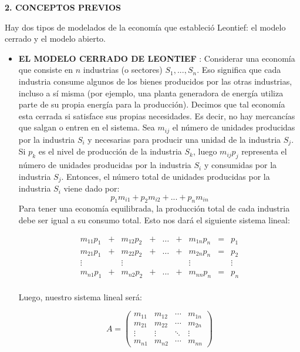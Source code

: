 \documentclass[10pt,a4paper]{article}
\begin{document}
\begin{multicols}{2}
\begin{center}
{\large \bf 2. CONCEPTOS PREVIOS}
\end{center}
Hay dos tipos de modelados de la economía que estableció Leontief: el modelo cerrado y el modelo abierto.\\
\begin{itemize}
	\item \textbf{EL MODELO CERRADO DE LEONTIEF} : Considerar una economía que consiste en $n$ industrias (o sectores)   $S_{1}, ... , S_{n}$. Eso significa que cada industria consume algunos de los bienes producidos por las otras industrias, incluso a sí misma (por ejemplo, una planta generadora de energía utiliza parte de su propia energía para la producción). Decimos que tal economía esta cerrada si satisface sus propias necesidades. Es decir, no hay mercancías que salgan o entren en el sistema. Sea $m_{ij}$ el número de unidades producidas por la industria $S_{i}$ y necesarias para producir una unidad de la industria $S_{j}$. Si $p_{k}$ es el nivel de producción de la industria $S_{k}$, luego $m_{ij}p_{j}$ representa el número de unidades producidas por la industria $S_{i}$ y consumidas por la industria $S_{j}$. Entonces, el número total de unidades producidas por la industria $S_{i}$ viene dado por:
\[  p_{1}m_{i1} + p_{2}m_{i2} + ... + p_{n}m_{in} \]
Para tener una economía equilibrada, la producción total de cada industria debe ser igual a su consumo total. Esto nos dará el siguiente sistema lineal:

\begin{equation*}
	\begin{matrix}
	m_{11}p_{1} &+& m_{12}p_{2} &+& \ldots  &+ &m_{1n}p_{n} &=& p_{1}\\
	m_{21}p_{1} &+& m_{22}p_{2} &+&\ldots  &+& m_{2n}p_{n} &=& p_{2}\\
	\vdots&&\vdots&&&&\vdots&&\vdots\\         
	m_{n1}p_{1} &+& m_{n2}p_{2} &+& ... & +& m_{nn}p_{n} &=& p_{n}
	\end{matrix}
\end{equation*}\\
Luego, nuestro sistema lineal será:       
 
 \[ A =
 \left( \begin{array}{cccc}
 m_{11} & m_{12} & \cdots & m_{1n} \\ 
 m_{21} & m_{22} & \cdots & m_{2n} \\
 \vdots & \vdots & \ddots & \vdots \\
 m_{n1} & m_{n2} & \cdots & m_{nn}
 \end{array} \right) \]\\
 

\end{itemize}
\end{multicols}
\end{document}
